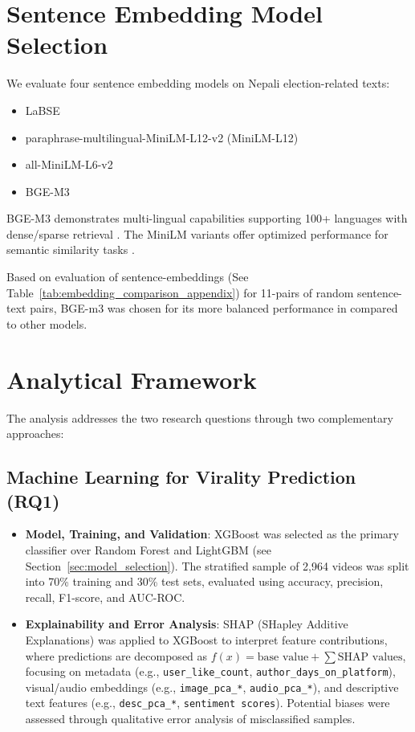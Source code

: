 \documentclass[12pt,a4paper]{report}
\begin{document}
\section{Sentence Embedding Model Selection}
We evaluate four sentence embedding models on Nepali election-related texts:
\begin{itemize}
    \item LaBSE \parencite{reimers-2019}
    \item paraphrase-multilingual-MiniLM-L12-v2 (MiniLM-L12) \parencite{paraphrase-multilingual-MiniLM-L12-v2}
    \item all-MiniLM-L6-v2 \parencite{all-MiniLM-L6-v2}
    \item BGE-M3 \parencite{bge-m3}
\end{itemize}

BGE-M3 demonstrates multi-lingual capabilities supporting 100+ languages with dense/sparse retrieval \parencite{bge-m3}. The MiniLM variants offer optimized performance for semantic similarity tasks \parencite{reimers-2019}.

Based on evaluation of sentence-embeddings (See Table~\ref{tab:embedding_comparison_appendix}) for 11-pairs of random sentence-text pairs, BGE-m3 was chosen for its more balanced performance in compared to other models. 

\section{Analytical Framework}

The analysis addresses the two research questions through two complementary approaches:

\subsection{Machine Learning for Virality Prediction (RQ1)}
\begin{itemize}
    \item \textbf{Model, Training, and Validation}: XGBoost was selected as the primary classifier over Random Forest and LightGBM (see Section~\ref{sec:model_selection}). The stratified sample of 2,964 videos was split into 70\% training and 30\% test sets, evaluated using accuracy, precision, recall, F1-score, and AUC-ROC.
    
    \item \textbf{Explainability and Error Analysis}: SHAP (SHapley Additive Explanations) was applied to XGBoost to interpret feature contributions, where predictions are decomposed as $f(x) = \text{base value} + \sum \text{SHAP values}$, focusing on metadata (e.g., \texttt{user\_like\_count}, \texttt{author\_days\_on\_platform}), visual/audio embeddings (e.g., \texttt{image\_pca\_*}, \texttt{audio\_pca\_*}), and descriptive text features (e.g., \texttt{desc\_pca\_*}, \texttt{sentiment scores}). Potential biases were assessed through qualitative error analysis of misclassified samples.
\end{itemize}
\end{document}
